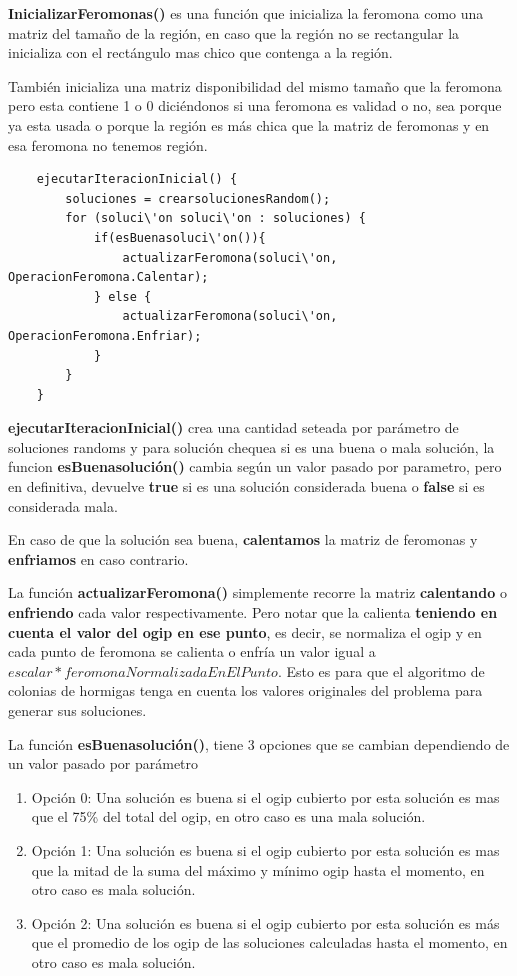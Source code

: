 \textbf{InicializarFeromonas()} es una funci\'on que inicializa la feromona como una matriz del tamaño de la regi\'on, en caso que la regi\'on no se rectangular la inicializa con el rect\'angulo mas chico que contenga a la regi\'on. 

Tambi\'en inicializa una matriz disponibilidad del mismo tamaño que la feromona pero esta contiene 1 o 0 dici\'endonos si una feromona es validad o no, sea porque ya esta usada o porque la regi\'on es m\'as chica que la matriz de feromonas y en esa feromona no tenemos regi\'on.


\begin{verbatim}
    ejecutarIteracionInicial() {
        soluciones = crearsolucionesRandom();
        for (soluci\'on soluci\'on : soluciones) {
            if(esBuenasoluci\'on()){
                actualizarFeromona(soluci\'on, OperacionFeromona.Calentar);
            } else {
                actualizarFeromona(soluci\'on, OperacionFeromona.Enfriar);
            }
        }
    }
\end{verbatim}		

\textbf{ejecutarIteracionInicial()} crea una cantidad seteada por par\'ametro de soluciones randoms y para soluci\'on chequea si es una buena o mala soluci\'on, la funcion \textbf{esBuenasoluci\'on()} cambia seg\'un un valor pasado por parametro, pero en definitiva, devuelve \textbf{true} si es una soluci\'on considerada buena o \textbf{false} si es considerada mala. 

En caso de que la soluci\'on sea buena, \textbf{calentamos} la matriz de feromonas y \textbf{enfriamos} en caso contrario.

La funci\'on \textbf{actualizarFeromona()} simplemente recorre la matriz \textbf{calentando} o \textbf{enfriendo} cada valor respectivamente. Pero notar que la calienta \textbf{teniendo en cuenta el valor del ogip en ese punto}, es decir, se normaliza el ogip y en cada punto de feromona se calienta o enfr\'ia un valor igual a $escalar * feromonaNormalizadaEnElPunto$. Esto es para que el algoritmo de colonias de hormigas tenga en cuenta los valores originales del problema para generar sus soluciones.


La funci\'on \textbf{esBuenasoluci\'on()}, tiene 3 opciones que se cambian dependiendo de un valor pasado por par\'ametro

\begin{enumerate}
\item Opci\'on 0: Una soluci\'on es buena si el ogip cubierto por esta soluci\'on es mas que el 75\% del total del ogip, en otro caso es una mala soluci\'on.
\item Opci\'on 1: Una soluci\'on es buena si el ogip cubierto por esta soluci\'on es mas que la mitad de la suma del m\'aximo y m\'inimo ogip hasta el momento, en otro caso es mala soluci\'on.
\item Opci\'on 2: Una soluci\'on es buena si el ogip cubierto por esta soluci\'on es m\'as que el promedio de los ogip de las soluciones calculadas hasta el momento, en otro caso es mala soluci\'on. 
\end{enumerate}


